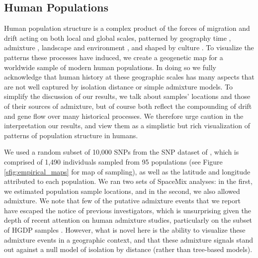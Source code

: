 \documentclass[12pt]{article}
\begin{document}
\subsection*{Human Populations}
Human population structure is a complex product of the forces of migration and drift acting on both local and global scales, patterned by geography \citep{novembre_genes_2008, ralph2013geography} time \citep{skoglund2012origins, skoglund_investigating_2014}, admixture \citep{Hellenthal},  landscape and environment \citep{Beall2010, Bigham2010, Bradburd2013}, and shaped by culture \citep{reich_india_2009, Atzmon2010, moorjani_history_2011}. To visualize the patterns these processes have induced, we create a geogenetic map for a worldwide sample of modern human populations. In doing so we fully acknowledge that human history at these geographic scales has many aspects that are not well captured by isolation distance or simple admixture models. To simplify the discussion of our results, we talk about samples' locations and those of their sources of admixture, but of course both reflect the compounding of drift and gene flow over many historical processes.  We therefore urge caution in the interpretation our results, and view them as a simplistic but rich visualization of patterns of population structure in humans. 

We used a random subset of 10,000 SNPs from the SNP dataset of \citet{Hellenthal}, which is comprised of 1,490 individuals sampled from 95 populations (see Figure \ref{sfig:empirical_maps} for map of sampling), as well as the latitude and longitude attributed to each population.  
We ran two sets of SpaceMix analyses: in the first, we estimated population sample locations, 
and in the second, we also allowed admixture. 
We note that few of the putative admixture events that we report have escaped the notice of previous investigators, 
which is unsurprising given the depth of recent attention on human admixture studies, particularly on the subset of HGDP samples 
\citep[see ][for various global analyses]{rosenberg_genetic_2002,li_worldwide_2008,Loh:13,patterson_ancient_2012,Hellenthal}. 
However, what is novel here is the ability to visualize these admixture events in a geographic context, 
and that these admixture signals stand out against a null model of isolation by distance (rather than tree-based models).
\end{document}
